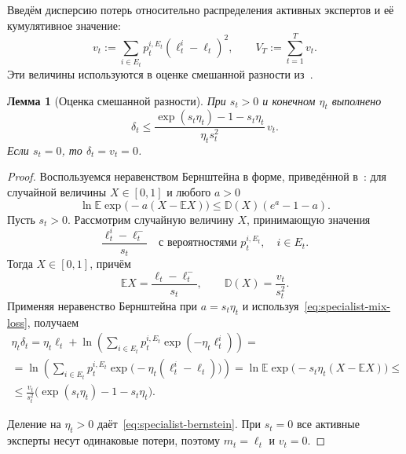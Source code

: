 \documentclass[a4paper,12pt]{article}
\theoremstyle{plain}
\newtheorem*{lemma}{Лемма}
\theoremstyle{definition}
\theoremstyle{remark}
\numberwithin{equation}{section}
\begin{document}
Введём дисперсию потерь относительно распределения активных экспертов и её кумулятивное значение:
\begin{equation}
\label{eq:specialist-variance}
v_t := \sum_{i\in E_t}p_t^{i,E_t}(\ell_t^i-\ell_t)^2,
\qquad
V_T := \sum_{t=1}^{T}v_t.
\end{equation}
Эти величины используются в оценке смешанной разности из~\cite[лемма~6]{VyuginSham}.

\begin{lemma}[Оценка смешанной разности]
При $s_t>0$ и конечном $\eta_t$ выполнено
\begin{equation}
\label{eq:specialist-bernstein}
\delta_t \leqslant
\frac{\exp(s_t\eta_t)-1-s_t\eta_t}{\eta_t s_t^2}\,v_t.
\end{equation}
Если $s_t=0$, то $\delta_t=v_t=0$.
\end{lemma}

\begin{proof}
Воспользуемся неравенством Бернштейна в форме, приведённой в~\cite[леммы~A.4--A.5, с.~361--362]{CBL}: для случайной величины $X\in[0,1]$ и любого $a>0$
\[
\ln\mathbb{E}\exp\bigl(-a(X-\mathbb{E}X)\bigr)
\leqslant \mathbb{D}(X)(e^a-1-a).
\]
Пусть $s_t>0$. Рассмотрим случайную величину $X$, принимающую значения
\[
\frac{\ell_t^i-\ell_t^-}{s_t}
\quad\text{с вероятностями }p_t^{i,E_t},\quad i\in E_t.
\]
Тогда $X\in[0,1]$, причём
\[
\mathbb{E}X = \frac{\ell_t-\ell_t^-}{s_t},
\qquad
\mathbb{D}(X)=\frac{v_t}{s_t^2}.
\]
Применяя неравенство Бернштейна при $a=s_t\eta_t$ и используя~\eqref{eq:specialist-mix-loss}, получаем
\begin{multline*}
  \eta_t\delta_t
= \eta_t\ell_t+
   \ln\left(\sum_{i\in E_t}p_t^{i,E_t}\exp(-\eta_t\ell_t^i)\right) =\\
= \ln\left(\sum_{i\in E_t}p_t^{i,E_t}
   \exp\bigl(-\eta_t(\ell_t^i-\ell_t)\bigr)\right)
= \ln\mathbb{E}\exp\bigl(-s_t\eta_t(X-\mathbb{E}X)\bigr) \leqslant\\
\leqslant \frac{v_t}{s_t^2}
   \bigl(\exp(s_t\eta_t)-1-s_t\eta_t\bigr).
\end{multline*} 

Деление на $\eta_t>0$ даёт~\eqref{eq:specialist-bernstein}. При $s_t=0$ все активные эксперты несут одинаковые потери, поэтому $m_t=\ell_t$ и $v_t=0$.
\end{proof}
\end{document}
